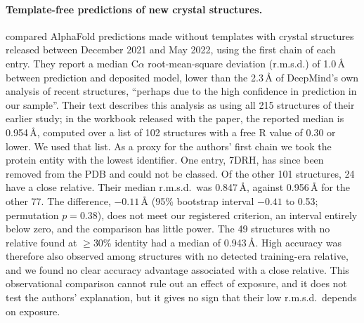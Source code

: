 \documentclass{article}
\begin{document}
\paragraph{Template-free predictions of new crystal structures.}
\citet{terwilliger2024} compared AlphaFold predictions made without templates
with crystal structures released between December 2021 and May 2022, using
the first chain of each entry. They report a median C$\alpha$ root-mean-square
deviation (r.m.s.d.) of 1.0\,\AA{} between prediction and deposited model,
lower than the 2.3\,\AA{} of DeepMind's own analysis of recent structures,
``perhaps due to the high confidence in prediction in our sample''. Their text
describes this analysis as using all 215 structures of their earlier study; in
the workbook released with the paper, the reported median is 0.954\,\AA{},
computed over a list of 102 structures with a free R value of 0.30 or lower.
We used that list. As a proxy for the authors' first chain we took the
protein entity with the lowest identifier. One entry, 7DRH, has since been
removed from the PDB and could not be classed. Of the other 101 structures,
24 have a close relative. Their median r.m.s.d.\ was 0.847\,\AA{}, against
0.956\,\AA{} for the other 77. The difference, $-0.11$\,\AA{} (95\% bootstrap
interval $-0.41$ to 0.53; permutation $p = 0.38$), does not meet our
registered criterion, an interval entirely below zero, and the comparison has
little power. The 49 structures with no relative found at $\ge$30\% identity
had a median of 0.943\,\AA{}. High accuracy was therefore also observed among
structures with no detected training-era relative, and we found no clear
accuracy advantage associated with a close relative. This observational
comparison cannot rule out an effect of exposure, and it does not test the
authors' explanation, but it gives no sign that their low r.m.s.d.\ depends
on exposure.
\end{document}
